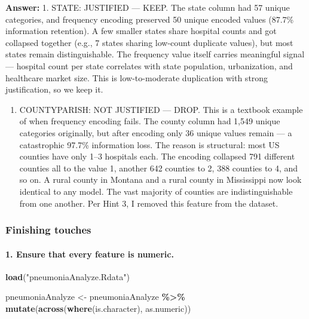 \documentclass[
]{article}
\newenvironment{Shaded}{\begin{snugshade}}{\end{snugshade}}
\newcommand{\FunctionTok}[1]{\textcolor[rgb]{0.13,0.29,0.53}{\textbf{#1}}}
\newcommand{\NormalTok}[1]{#1}
\newcommand{\OtherTok}[1]{\textcolor[rgb]{0.56,0.35,0.01}{#1}}
\newcommand{\SpecialCharTok}[1]{\textcolor[rgb]{0.81,0.36,0.00}{\textbf{#1}}}
\newcommand{\StringTok}[1]{\textcolor[rgb]{0.31,0.60,0.02}{#1}}
\providecommand{\tightlist}{%
  \setlength{\itemsep}{0pt}\setlength{\parskip}{0pt}}
\begin{document}
\textbf{Answer:} 1. STATE: JUSTIFIED --- KEEP. The state column had 57
unique categories, and frequency encoding preserved 50 unique encoded
values (87.7\% information retention). A few smaller states share
hospital counts and got collapsed together (e.g., 7 states sharing
low-count duplicate values), but most states remain distinguishable. The
frequency value itself carries meaningful signal --- hospital count per
state correlates with state population, urbanization, and healthcare
market size. This is low-to-moderate duplication with strong
justification, so we keep it.

\begin{enumerate}
\def\labelenumi{\arabic{enumi}.}
\setcounter{enumi}{1}
\tightlist
\item
  COUNTYPARISH: NOT JUSTIFIED --- DROP. This is a textbook example of
  when frequency encoding fails. The county column had 1,549 unique
  categories originally, but after encoding only 36 unique values remain
  --- a catastrophic 97.7\% information loss. The reason is structural:
  most US counties have only 1--3 hospitals each. The encoding collapsed
  791 different counties all to the value 1, another 642 counties to 2,
  388 counties to 4, and so on. A rural county in Montana and a rural
  county in Mississippi now look identical to any model. The vast
  majority of counties are indistinguishable from one another. Per Hint
  3, I removed this feature from the dataset.
\end{enumerate}

\subsubsection{Finishing touches}\label{finishing-touches}

\paragraph{1. Ensure that every feature is
numeric.}\label{ensure-that-every-feature-is-numeric.}

\begin{Shaded}
\begin{Highlighting}[]
\FunctionTok{load}\NormalTok{(}\StringTok{"pneumoniaAnalyze.Rdata"}\NormalTok{)}

\NormalTok{pneumoniaAnalyze }\OtherTok{\textless{}{-}}\NormalTok{ pneumoniaAnalyze }\SpecialCharTok{\%\textgreater{}\%} 
  \FunctionTok{mutate}\NormalTok{(}\FunctionTok{across}\NormalTok{(}\FunctionTok{where}\NormalTok{(is.character), as.numeric))}
\end{Highlighting}
\end{Shaded}
\end{document}
